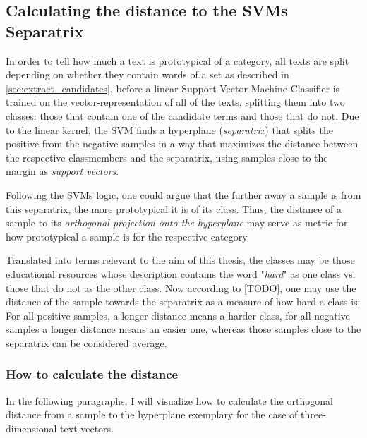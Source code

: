 \subsection{Calculating the distance to the SVMs Separatrix}
\label{sec:calculate_distance}

In order to tell how much a text is prototypical of a category, all texts are split depending on whether they contain words of a set as described in \ref{sec:extract_candidates}, before a linear Support Vector Machine Classifier is trained on the vector-representation of all of the texts, splitting them into two classes: those that contain one of the candidate terms and those that do not. Due to the linear kernel, the SVM finds a hyperplane (\textit{separatrix}) that splits the positive from the negative samples in a way that maximizes the distance between the respective classmembers and the separatrix, using samples close to the margin as \textit{support vectors}. %

Following the SVMs logic, one could argue that the further away a sample is from this separatrix, the more prototypical it is of its class. Thus, the distance of a sample to its \textit{orthogonal projection onto the hyperplane} %
may serve as metric for how prototypical a sample is for the respective category. 

Translated into terms relevant to the aim of this thesis, the classes may be those educational resources whose description contains the word "\textit{hard}" as one class vs. those that do not as the other class. Now according to [TODO], one may use the distance of the sample towards the separatrix as a measure of how hard a class is: For all positive samples, a longer distance means a harder class, for all negative samples a longer distance means an easier one, whereas those samples close to the separatrix can be considered average.

\subsubsection*{How to calculate the distance}

\noindent In the following paragraphs, I will visualize how to calculate the orthogonal distance from a sample to the hyperplane exemplary for the case of three-dimensional text-vectors.

